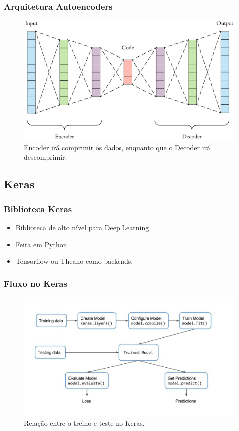 \documentclass{beamer}
\begin{document}
\begin{frame}
\frametitle{Arquitetura Autoencoders}
\begin{figure}
\includegraphics[width=0.9\linewidth]{images/autoencoder}
\caption{Encoder irá comprimir os dados, enquanto que o Decoder irá descomprimir.}
\end{figure}
\end{frame}

\subsection{Keras}

\begin{frame}
\frametitle{Biblioteca Keras}
\begin{itemize}
\item Biblioteca de alto nível para Deep Learning.
\item Feita em Python.
\item Tensorflow ou Theano como backends.
\end{itemize}
\end{frame}

\begin{frame}
\frametitle{Fluxo no Keras}
\begin{figure}
\includegraphics[width=0.9\linewidth]{images/keras-flow}
\caption{Relação entre o treino e teste no Keras.}
\end{figure}
\end{frame}
\end{document}
